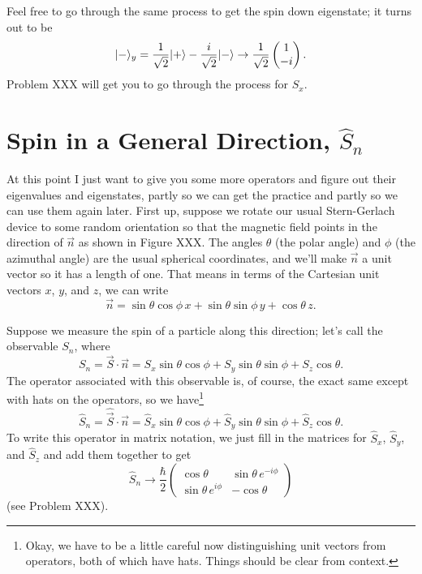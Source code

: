Feel free to go through the same process to get the spin down eigenstate; it turns out to be
\begin{equation}
| - \rangle_y = \frac{1}{\sqrt{2}} | + \rangle - \frac{i}{\sqrt{2}} | - \rangle \to \frac{1}{\sqrt{2}} \begin{pmatrix} 1 \\ -i \end{pmatrix}.
\end{equation}
Problem XXX will get you to go through the process for $S_x$.



\section{Spin in a General Direction, $\hat{S}_n$}

At this point I just want to give you some more operators and figure out their eigenvalues and eigenstates, partly so we can get the practice and partly so we can use them again later.  First up, suppose we rotate our usual Stern-Gerlach device to some random orientation so that the magnetic field points in the direction of $\vec{n}$ as shown in Figure XXX.  The angles $\theta$ (the polar angle) and $\phi$ (the azimuthal angle) are the usual spherical coordinates, and we'll make $\vec{n}$ a unit vector so it has a length of one.  That means in terms of the Cartesian unit vectors $\unit{x}$, $\unit{y}$, and $\unit{z}$, we can write
\begin{equation}
\vec{n} = \sin \theta \cos \phi \, \unit{x} + \sin \theta \sin \phi \, \unit{y} + \cos \theta \, \unit{z}.
\end{equation}

Suppose we measure the spin of a particle along this direction; let's call the observable $S_n$, where
\begin{equation}
S_n = \vec{S} \cdot \vec{n} = S_x \sin \theta \cos \phi  + S_y \sin \theta \sin \phi + S_z \cos \theta.
\end{equation}
The operator associated with this observable is, of course, the exact same except with hats on the operators, so we have\footnote{Okay, we have to be a little careful now distinguishing unit vectors from operators, both of which have hats.  Things should be clear from context.}
\begin{equation}
\hat{S}_n = \hat{\vec{S}} \cdot \vec{n} = \hat{S}_x \sin \theta \cos \phi  + \hat{S}_y \sin \theta \sin \phi  + \hat{S}_z \cos \theta.
\end{equation}
To write this operator in matrix notation, we just fill in the matrices for $\hat{S}_x$, $\hat{S}_y$, and $\hat{S}_z$ and add them together to get
\begin{equation}
\hat{S}_n \to \frac{\hbar}{2} \begin{pmatrix} \cos \theta & \sin \theta \, e^{-i\phi} \\ \sin \theta \, e^{i\phi} & -\cos \theta \end{pmatrix}
\end{equation}
(see Problem XXX).

